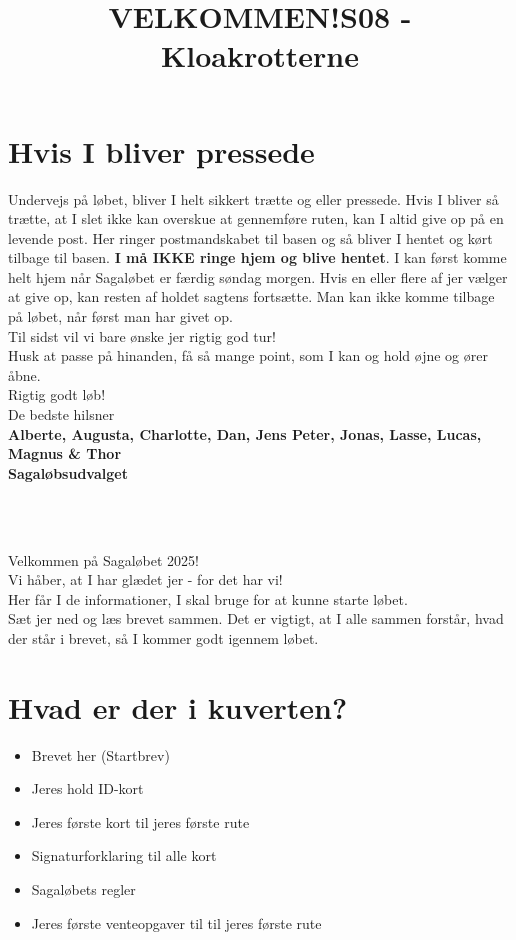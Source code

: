 \section{Hvis I bliver pressede}
Undervejs på løbet, bliver I helt sikkert trætte og eller pressede. Hvis I bliver så trætte, at I slet ikke kan overskue at gennemføre ruten, kan I altid give op på en levende post. Her ringer postmandskabet til basen og så bliver I hentet og kørt tilbage til basen. \textbf{I må IKKE ringe hjem og blive hentet}. I kan først komme helt hjem når Sagaløbet er færdig søndag morgen. Hvis en eller flere af jer vælger at give op, kan resten af holdet sagtens fortsætte. Man kan ikke komme tilbage på løbet, når først man har givet op.\\
\newline
Til sidst vil vi bare ønske jer rigtig god tur!\\
Husk at passe på hinanden, få så mange point, som I kan og hold øjne og ører åbne.\\
\newline
Rigtig godt løb!\\
\newline
\textcolor{søblå}{De bedste hilsner}\\
\textcolor{natblå}{\textbf{Alberte, Augusta, Charlotte, Dan, Jens Peter, Jonas, Lasse, Lucas, Magnus \& Thor}}\\
\textcolor{natblå}{\textbf{Sagaløbsudvalget}}\\
\newpage
\title{VELKOMMEN!}\\
\newline
\title{\textcolor{flammefarvet}{S08 - Kloakrotterne }}\\
\newline
Velkommen på Sagaløbet 2025!\\
Vi håber, at I har glædet jer - for det har vi!\\
Her får I de informationer, I skal bruge for at kunne starte løbet.\\
Sæt jer ned og læs brevet sammen. Det er vigtigt, at I alle sammen forstår, hvad der står i brevet, så I kommer godt igennem løbet.
\section{Hvad er der i kuverten?}
\begin{itemize}
    \item Brevet her (Startbrev)
    \item Jeres hold ID-kort
    \item Jeres første kort til jeres første rute
    \item Signaturforklaring til alle kort
    \item Sagaløbets regler
    \item Jeres første venteopgaver til til jeres første rute
\end{itemize}

